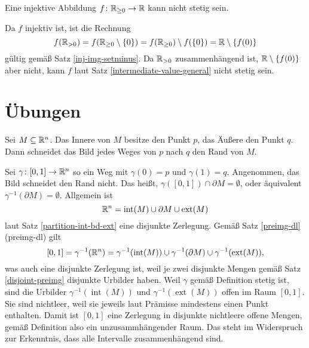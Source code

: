 \begin{Satz}
Eine injektive Abbildung $f\colon\mathbb R_{\ge 0}\to\mathbb R$ kann nicht stetig sein.
\end{Satz}
\begin{Beweis}
Da $f$ injektiv ist, ist die Rechnung
\[f(\mathbb R_{>0}) = f(\mathbb R_{\ge 0}\setminus\{0\})
= f(\mathbb R_{\ge 0})\setminus f(\{0\}) = \mathbb R\setminus\{f(0)\}\]
gültig gemäß Satz \ref{inj-img-setminus}. Da $\mathbb R_{>0}$ zusammenhängend
ist, $\mathbb R\setminus\{f(0)\}$ aber nicht, kann $f$ laut Satz
\ref{intermediate-value-general} nicht stetig sein.\,\qedsymbol
\end{Beweis}

\section{Übungen}

\begin{Satz}
Sei $M\subseteq\mathbb R^n$. Das Innere von $M$ besitze den Punkt $p$,
das Äußere den Punkt $q$. Dann schneidet das Bild jedes Weges von $p$
nach $q$ den Rand von $M$.
\end{Satz}
\begin{Beweis}[Beweis 1]
Sei $\gamma\colon [0,1]\to\mathbb R^n$ so ein Weg mit
$\gamma(0)=p$ und $\gamma(1)=q$. Angenommen, das Bild schneidet
den Rand nicht. Das heißt, $\gamma([0,1])\cap\partial M = \emptyset$,
oder äquivalent $\gamma^{-1}(\partial M)=\emptyset$.
Allgemein ist
\[\mathbb R^n = \operatorname{int}(M) \cup \partial M \cup \operatorname{ext}(M)\]
laut Satz \ref{partition-int-bd-ext} eine disjunkte Zerlegung.
Gemäß Satz \ref{preimg-dl} (preimg-dl) gilt
\[[0,1] = \gamma^{-1}(\mathbb R^n) = \gamma^{-1}(\operatorname{int}(M))
\cup \gamma^{-1}(\partial M)\cup \gamma^{-1}(\operatorname{ext}(M)),\]
was auch eine disjunkte Zerlegung ist, weil je zwei disjunkte Mengen
gemäß Satz \ref{disjoint-preimg} disjunkte Urbilder haben.
Weil $\gamma$ gemäß Definition stetig ist,
sind die Urbilder $\gamma^{-1}(\operatorname{int}(M))$ und
$\gamma^{-1}(\operatorname{ext}(M))$ offen im Raum $[0,1]$. Sie sind
nichtleer, weil sie jeweils laut Prämisse mindestens einen Punkt
enthalten. Damit ist $[0,1]$ eine Zerlegung in disjunkte nichtleere
offene Mengen, gemäß Definition also ein unzusammhängender Raum. Das
steht im Widerspruch zur Erkenntnis, dass alle Intervalle
zusammenhängend sind.\,\qedsymbol
\end{Beweis}


